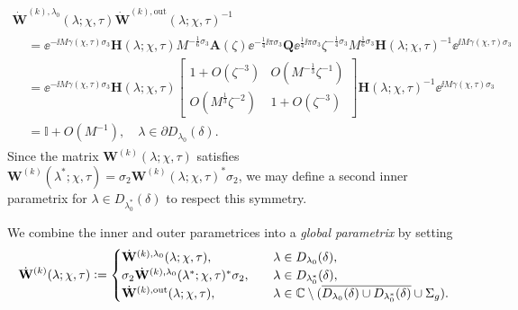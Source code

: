 \begin{multline}
\dot{\mathbf{W}}^{(k),\lambda_0}(\lambda;\chi,\tau)\dot{\mathbf{W}}^{(k),\mathrm{out}}(\lambda;\chi,\tau)^{-1} \\
\begin{aligned}
&= \ee^{-\ii M\gamma(\chi,\tau)\sigma_3}\mathbf{H}(\lambda;\chi,\tau)M^{-\frac{1}{6}\sigma_3}\mathbf{A}(\zeta)\ee^{-\frac{1}{4}\ii\pi\sigma_3}\mathbf{Q}\ee^{\frac{1}{4}\ii\pi\sigma_3}\zeta^{-\frac{1}{4}\sigma_3}M^{\frac{1}{6}\sigma_3}\mathbf{H}(\lambda;\chi,\tau)^{-1}\ee^{\ii M\gamma(\chi,\tau)\sigma_3}\\
&=\ee^{-\ii M\gamma(\chi,\tau)\sigma_3}\mathbf{H}(\lambda;\chi,\tau)\begin{bmatrix}1+O(\zeta^{-3}) & O(M^{-\frac{1}{3}}\zeta^{-1})\\O(M^\frac{1}{3}\zeta^{-2}) & 1+O(\zeta^{-3})\end{bmatrix}
\mathbf{H}(\lambda;\chi,\tau)^{-1}\ee^{\ii M\gamma(\chi,\tau)\sigma_3}\\
&=\mathbb{I}+O(M^{-1}),\quad\lambda\in\partial D_{\lambda_0}(\delta).
\end{aligned}
\label{eq:Dplus-mismatch-Schi-Stau-ALT}
\end{multline}
Since the matrix $\mathbf{W}^{(k)}(\lambda;\chi,\tau)$ satisfies $\mathbf{W}^{(k)}(\lambda^*;\chi,\tau)=\sigma_2\mathbf{W}^{(k)}(\lambda;\chi,\tau)^*\sigma_2$, 
we may define a second inner parametrix for $\lambda\in D_{\lambda_0^*}(\delta)$ to respect this symmetry.

We combine the inner and outer parametrices into a \emph{global parametrix} by setting
\begin{equation}
\dot{\mathbf{W}}^{(k)}(\lambda;\chi,\tau)\vcentcolon=\begin{cases}
\dot{\mathbf{W}}^{(k),\lambda_0}(\lambda;\chi,\tau),&\quad\lambda\in D_{\lambda_0}(\delta),\\
\sigma_2\dot{\mathbf{W}}^{(k),\lambda_0}(\lambda^*;\chi,\tau)^*\sigma_2,&\quad\lambda\in D_{\lambda_0^*}(\delta),\\
\dot{\mathbf{W}}^{(k),\mathrm{out}}(\lambda;\chi,\tau),&\quad\lambda\in\mathbb{C}\setminus(\overline{D_{\lambda_0}(\delta)\cup D_{\lambda_0^*}(\delta)}\cup\Sigma_g).
\end{cases}
\label{eq:global-parametrix-Schi-Stau-ALT}
\end{equation}

